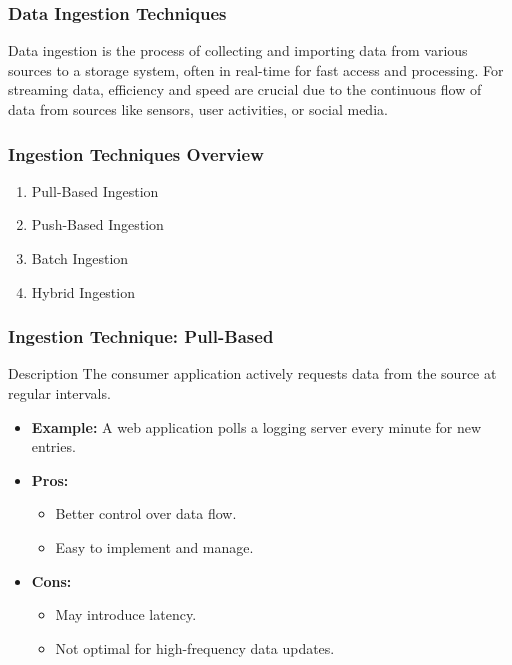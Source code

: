 \documentclass[aspectratio=169]{beamer}
\begin{document}
\begin{frame}
    \frametitle{Data Ingestion Techniques}
    Data ingestion is the process of collecting and importing data from various sources to a storage system, often in real-time for fast access and processing. For streaming data, efficiency and speed are crucial due to the continuous flow of data from sources like sensors, user activities, or social media.
\end{frame}

\begin{frame}
    \frametitle{Ingestion Techniques Overview}
    \begin{enumerate}
        \item Pull-Based Ingestion
        \item Push-Based Ingestion
        \item Batch Ingestion
        \item Hybrid Ingestion
    \end{enumerate}
\end{frame}

\begin{frame}
    \frametitle{Ingestion Technique: Pull-Based}
    \begin{block}{Description}
        The consumer application actively requests data from the source at regular intervals.
    \end{block}
    \begin{itemize}
        \item \textbf{Example:} A web application polls a logging server every minute for new entries.
        \item \textbf{Pros:}
            \begin{itemize}
                \item Better control over data flow.
                \item Easy to implement and manage.
            \end{itemize}
        \item \textbf{Cons:}
            \begin{itemize}
                \item May introduce latency.
                \item Not optimal for high-frequency data updates.
            \end{itemize}
    \end{itemize}
\end{frame}
\end{document}
